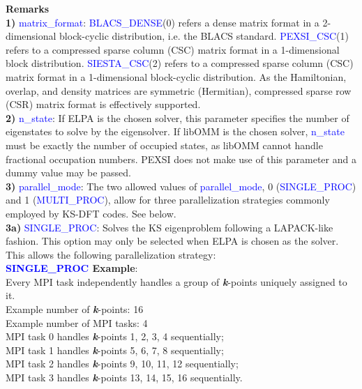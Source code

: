 \documentclass{report}
\begin{document}
\bigskip
\textbf{Remarks}\\

\textbf{1)} \textcolor{blue}{matrix\_format}:  \textcolor{blue}{BLACS\_DENSE}(0) refers a dense matrix format in a 2-dimensional block-cyclic distribution, i.e. the BLACS standard.  \textcolor{blue}{PEXSI\_CSC}(1) refers to a compressed sparse column (CSC) matrix format in a 1-dimensional block distribution.  \textcolor{blue}{SIESTA\_CSC}(2) refers to a compressed sparse column (CSC) matrix format in a 1-dimensional block-cyclic distribution.  As the Hamiltonian, overlap, and density matrices are symmetric (Hermitian), compressed sparse row (CSR) matrix format is effectively supported.\\

\textbf{2)} \textcolor{blue}{n\_state}:  If ELPA is the chosen solver, this parameter specifies the number of eigenstates to solve by the eigensolver.  If libOMM is the chosen solver, \textcolor{blue}{n\_state} must be exactly the number of occupied states, as libOMM cannot handle fractional occupation numbers\cite{libomm_corsetti_2014}.  PEXSI does not make use of this parameter and a dummy value may be passed.\\

\textbf{3)} \textcolor{blue}{parallel\_mode}:  The two allowed values of \textcolor{blue}{parallel\_mode}, 0 (\textcolor{blue}{SINGLE\_PROC}) and 1 (\textcolor{blue}{MULTI\_PROC}), allow for three parallelization strategies commonly employed by KS-DFT codes.  See below.\\

\textbf{3a)} \textcolor{blue}{SINGLE\_PROC}:  Solves the KS eigenproblem following a LAPACK-like fashion.  This option may only be selected when ELPA is chosen as the solver.  This allows the following parallelization strategy:\\

\textbf{\textcolor{blue}{SINGLE\_PROC} Example}:\\

Every MPI task independently handles a group of \textbf{\textit{k}}-points uniquely assigned to it.\\

Example number of \textbf{\textit{k}}-points:  16\\
Example number of MPI tasks:  4\\

MPI task 0 handles \textbf{\textit{k}}-points  1,  2,  3,  4 sequentially;\\
MPI task 1 handles \textbf{\textit{k}}-points  5,  6,  7,  8 sequentially;\\
MPI task 2 handles \textbf{\textit{k}}-points  9, 10, 11, 12 sequentially;\\
MPI task 3 handles \textbf{\textit{k}}-points 13, 14, 15, 16 sequentially.\\
\end{document}
